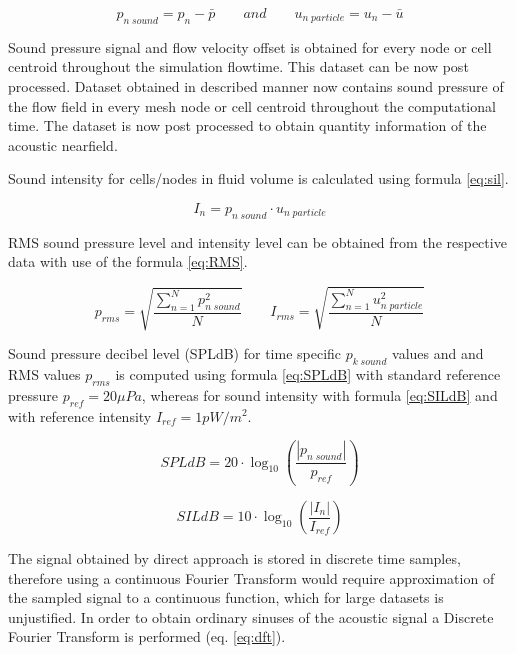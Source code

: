 \begin{equation} \label{eq:off}
p_{n \; sound} = p_n - \bar{p} \qquad and \qquad u_{n \; particle} = u_n - \bar{u}
\end{equation}

Sound pressure signal and flow velocity offset is obtained for every node or cell centroid throughout the simulation flowtime. This dataset can be now post processed. Dataset obtained in described manner now contains sound pressure of the flow field in every mesh node or cell centroid throughout the computational time. The dataset is now post processed to obtain quantity information of the acoustic nearfield. 

Sound intensity for cells/nodes in fluid volume is calculated using formula \ref{eq:sil}. 

\begin{equation} \label{eq:sil}
I_{n} = p_{n \; sound} \cdot u_{n \; particle}
\end{equation}

RMS sound pressure level and intensity level can be obtained from the respective data with use of the formula \ref{eq:RMS}.

\begin{equation} \label{eq:RMS}
p_{rms} = \sqrt{\frac{\sum_{n=1}^{N} p_{n \; sound}^{2}}{N}} \qquad I_{rms} = \sqrt{\frac{\sum_{n=1}^{N} u_{n \; particle}^{2}}{N}}
\end{equation}

Sound pressure decibel level (SPLdB) for time specific $p_{k \; sound}$ values and and RMS values $p_{rms}$ is computed using formula \ref{eq:SPLdB} with standard reference pressure $p_{ref} = 20 \mu Pa$, whereas for sound intensity with formula \ref{eq:SILdB} and with reference intensity $I_{ref} = 1 pW/m^{2}$.

\begin{equation} \label{eq:SPLdB}
SPLdB = 20 \cdot \log_{10}\left(\frac{|p_{n \; sound}|}{p_{ref}}\right)
\end{equation}

\begin{equation} \label{eq:SILdB}
SILdB = 10 \cdot \log_{10}\left(\frac{|I_{n}|}{I_{ref}}\right)
\end{equation}

The signal obtained by direct approach is stored in discrete time samples, therefore using a continuous Fourier Transform would require approximation of the sampled signal to a continuous function, which for large datasets is unjustified. In order to obtain ordinary sinuses of the acoustic signal a Discrete Fourier Transform is performed (eq. \ref{eq:dft}).

